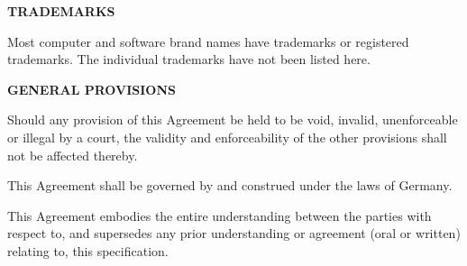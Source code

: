 \textbf{TRADEMARKS}

Most computer and software brand names have trademarks or registered trademarks. The individual trademarks have not been listed here.

\textbf{GENERAL PROVISIONS}

Should any provision of this Agreement be held to be void, invalid, unenforceable or illegal by a court, the validity and enforceability of the other provisions shall not be affected thereby. 

This Agreement shall be governed by and construed under the laws of Germany.

This Agreement embodies the entire understanding between the parties with respect to, and supersedes any prior understanding or agreement (oral or written) relating to, this specification.


\clearpage
